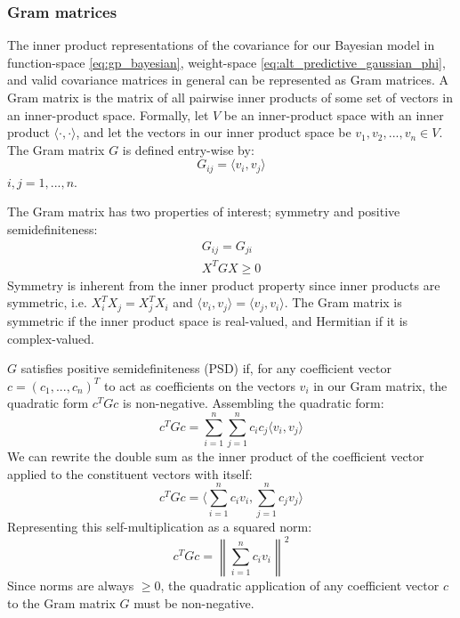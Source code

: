 \subsubsection{Gram matrices}
The inner product representations of the covariance for our Bayesian model in function-space \ref{eq:gp_bayesian}, weight-space \ref{eq:alt_predictive_gaussian_phi}, and valid covariance matrices in general can be represented as Gram matrices. \cite{gp-ml} A Gram matrix is the matrix of all pairwise inner products of some set of vectors in an inner-product space. Formally, let $V$ be an inner-product space with an inner product $\langle \cdot, \cdot \rangle$, and let the vectors in our inner product space be $v_1, v_2, ..., v_n \in V$. The Gram matrix $G$ is defined entry-wise by:
\begin{equation*}
    G_{ij} = \langle v_i, v_j \rangle
\end{equation*}
$i, j = 1, ..., n$.

The Gram matrix has two properties of interest; symmetry and positive semidefiniteness:
\begin{equation*}
    \begin{aligned}
        G_{ij} = G_{ji} \\
        X^T G X \geq 0
    \end{aligned}
\end{equation*}
Symmetry is inherent from the inner product property since inner products are symmetric, i.e. $X_i^T X_j = X_j^T X_i$ and $\langle v_i, v_j \rangle = \langle v_j, v_i \rangle$. The Gram matrix is symmetric if the inner product space is real-valued, and Hermitian if it is complex-valued.

$G$ satisfies positive semidefiniteness (PSD) if, for any coefficient vector $c = (c_1, ..., c_n)^T$ to act as coefficients on the vectors $v_i$ in our Gram matrix, the quadratic form $c^T G c$ is non-negative. Assembling the quadratic form:
\begin{equation*}
    c^T G c = \sum_{i=1}^n \sum_{j=1}^n c_i c_j \langle v_i, v_j \rangle
\end{equation*}
We can rewrite the double sum as the inner product of the coefficient vector applied to the constituent vectors with itself:
\begin{equation*}
    c^T G c = \langle \sum_{i=1}^n c_i v_i, \sum_{j=1}^n c_j v_j \rangle
\end{equation*}
Representing this self-multiplication as a squared norm:
\begin{equation*}
    c^T G c = \left\| \sum_{i=1}^n c_i v_i \right\|^2
\end{equation*}
Since norms are always $\geq 0$, the quadratic application of any coefficient vector $c$ to the Gram matrix $G$ must be non-negative. 


